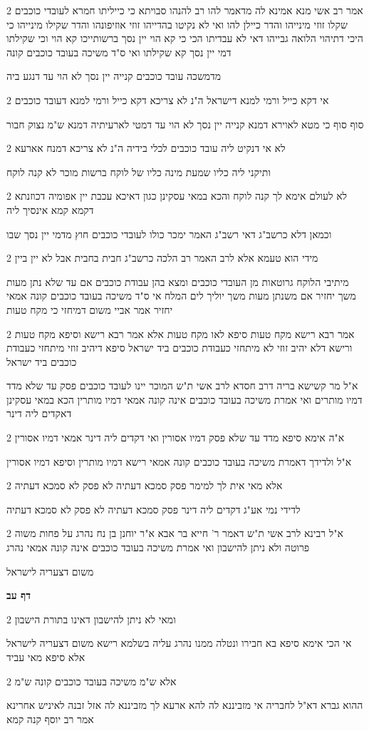 \documentclass[12pt, openany]{book}
\newcommand{\sethebfont}{
\fontsize{10.5pt}{21.0pt} \selectfont
}
\newcommand{\twocol}[1]{
	{\sethebfont \begin{multicols}{2}
			#1
	\end{multicols}}	
}
\newcommand{\sectname}{}
\newcommand{\newsection}[1]{
	\addcontentsline{toc}{section}{#1}
	\renewcommand{\sectname}{#1}	
	\vspace{-\baselineskip}
	\begin{center}
		\textbf{%
\fontsize{16pt}{16pt}\selectfont
			#1}
	\end{center}
	\vspace{-\baselineskip}
	\nopagebreak
}
\begin{document}
\twocol{אמר רב אשי מנא אמינא לה מדאמר להו רב להנהו סבויתא כי כייליתו חמרא לעובדי כוכבים שקלו זוזי מינייהו והדר כיילן להו ואי לא נקיטו בהדייהו זוזי אוזיפונהו והדר שקילו מינייהו כי היכי דתיהוי הלואה גבייהו דאי לא עבדיתו הכי כי קא הוי יין נסך ברשותייכו קא הוי וכי שקילתו דמי יין נסך קא שקילתו ואי ס"ד משיכה בעובד כוכבים קונה
\par מדמשכה עובד כוכבים קנייה יין נסך לא הוי עד דנגע ביה}
\twocol{אי דקא כייל ורמי למנא דישראל ה"נ לא צריכא דקא כייל ורמי למנא דעובד כוכבים
\par סוף סוף כי מטא לאוירא דמנא קנייה יין נסך לא הוי עד דמטי לארעיתיה דמנא ש"מ נצוק חבור}
\twocol{לא אי דנקיט ליה עובד כוכבים לכלי בידיה ה"נ לא צריכא דמנח אארעא
\par ותיקני ליה כליו שמעת מינה כליו של לוקח ברשות מוכר לא קנה לוקח}
\twocol{לא לעולם אימא לך קנה לוקח והכא במאי עסקינן כגון דאיכא עכבת יין אפומיה דכוזנתא דקמא קמא אינסיך ליה
\par וכמאן דלא כרשב"ג דאי רשב"ג האמר ימכר כולו לעובדי כוכבים חוץ מדמי יין נסך שבו}
\twocol{מידי הוא טעמא אלא לרב האמר רב הלכה כרשב"ג חבית בחבית אבל לא יין ביין
\par מיתיבי הלוקח גרוטאות מן העובדי כוכבים ומצא בהן עבודת כוכבים אם עד שלא נתן מעות משך יחזיר אם משנתן מעות משך יוליך לים המלח אי ס"ד משיכה בעובד כוכבים קונה אמאי יחזיר אמר אביי משום דמיחזי כי מקח טעות}
\twocol{אמר רבא רישא מקח טעות סיפא לאו מקח טעות אלא אמר רבא רישא וסיפא מקח טעות ורישא דלא יהיב זוזי לא מיתחזי כעבודת כוכבים ביד ישראל סיפא דיהיב זוזי מיתחזי כעבודת כוכבים ביד ישראל
\par א"ל מר קשישא בריה דרב חסדא לרב אשי ת"ש המוכר יינו לעובד כוכבים פסק עד שלא מדד דמיו מותרים ואי אמרת משיכה בעובד כוכבים אינה קונה אמאי דמיו מותרין הכא במאי עסקינן דאקדים ליה דינר}
\twocol{א"ה אימא סיפא מדד עד שלא פסק דמיו אסורין ואי דקדים ליה דינר אמאי דמיו אסורין
\par א"ל ולדידך דאמרת משיכה בעובד כוכבים קונה אמאי רישא דמיו מותרין וסיפא דמיו אסורין}
\twocol{אלא מאי אית לך למימר פסק סמכא דעתיה לא פסק לא סמכא דעתיה
\par לדידי נמי אע"ג דקדים ליה דינר פסק סמכא דעתיה לא פסק לא סמכא דעתיה}
\twocol{א"ל רבינא לרב אשי ת"ש דאמר ר' חייא בר אבא א"ר יוחנן בן נח נהרג על פחות משוה פרוטה ולא ניתן להישבון ואי אמרת משיכה בעובד כוכבים אינה קונה אמאי נהרג
\par משום דצעריה לישראל}
\newsection{דף עב}
\twocol{ומאי לא ניתן להישבון דאינו בתורת הישבון
\par אי הכי אימא סיפא בא חבירו ונטלה ממנו נהרג עליה בשלמא רישא משום דצעריה לישראל אלא סיפא מאי עביד}
\twocol{אלא ש"מ משיכה בעובד כוכבים קונה ש"מ
\par ההוא גברא דא"ל לחבריה אי מזביננא לה להא ארעא לך מזביננא לה אזל זבנה לאיניש אחרינא אמר רב יוסף קנה קמא}
\end{document}
